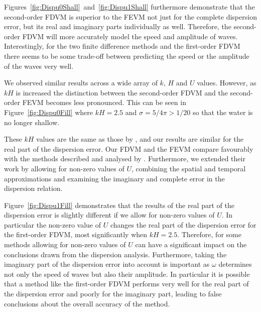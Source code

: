 Figures~\ref{fig:Dispu0Shall}~and~\ref{fig:Dispu1Shall} furthermore demonstrate that the second-order FDVM is superior to the FEVM not just for the complete dispersion error, but its real and imaginary parts individually as well. Therefore, the second-order FDVM will more accurately model the speed and amplitude of waves. Interestingly, for the two finite difference methods and the first-order FDVM there seems to be some trade-off between predicting the speed or the amplitude of the waves very well. 

We observed similar results across a wide array of $k$, $H$ and $U$ values. However, as $kH$ is increased the distinction between the second-order FDVM and the second-order FEVM becomes less pronounced. This can be seen in Figure~\ref{fig:Dispu0Fill} where $kH = 2.5$ and $\sigma = 5/4 \pi > 1/20$ so that the water is no longer shallow.

These $kH$ values are the same as those by \citet{Filippini-etal-2016-381}, and our results are similar for the real part of the dispersion error. Our FDVM and the FEVM compare favourably with the methods described and analysed by \citet{Filippini-etal-2016-381}. Furthermore, we extended their work by allowing for non-zero values of $U$, combining the spatial and temporal approximations and examining the imaginary and complete error in the dispersion relation. 

Figure~\ref{fig:Dispu1Fill} demonstrates that the results of the real part of the dispersion error  is slightly different if we allow for non-zero values of $U$. In particular the non-zero value of $U$ changes the real part of the dispersion error for the first-order FDVM, most significantly when $kH = 2.5$. Therefore, for some methods allowing for non-zero values of $U$ can have a significant impact on the conclusions drawn from the dispersion analysis. Furthermore, taking the imaginary part of the dispersion error into account is important as $\omega$ determines not only the speed of waves but also their amplitude. In particular it is possible that a method like the first-order FDVM performs very well for the real part of the dispersion error and poorly for the imaginary part, leading to false conclusions about the overall accuracy of the method.


